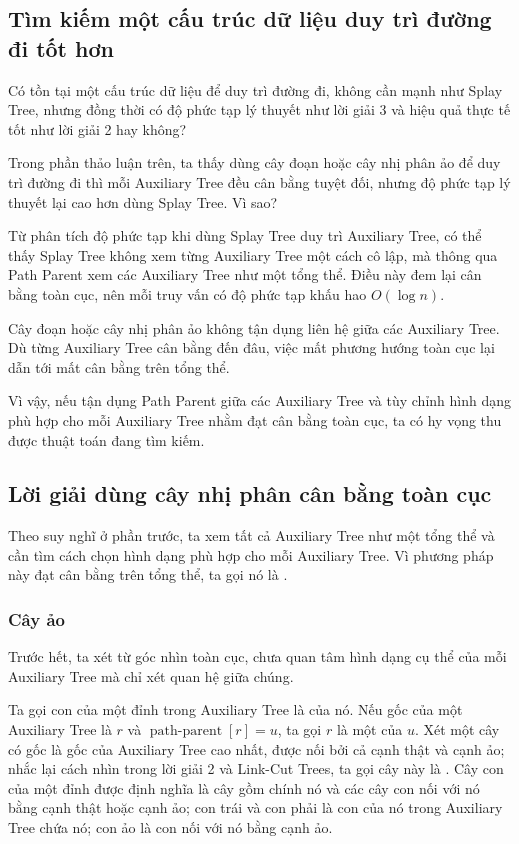 \documentclass[11pt]{article}
\begin{document}
\subsection{Tìm kiếm một cấu trúc dữ liệu duy trì đường đi tốt hơn}

Có tồn tại một cấu trúc dữ liệu để duy trì đường đi, không cần mạnh như
Splay Tree, nhưng đồng thời có độ phức tạp lý thuyết như lời giải 3 và hiệu
quả thực tế tốt như lời giải 2 hay không?

Trong phần thảo luận trên, ta thấy dùng cây đoạn hoặc cây nhị phân ảo để duy
trì đường đi thì mỗi Auxiliary Tree đều cân bằng tuyệt đối, nhưng độ phức tạp
lý thuyết lại cao hơn dùng Splay Tree. Vì sao?

Từ phân tích độ phức tạp khi dùng Splay Tree duy trì Auxiliary Tree, có thể
thấy Splay Tree không xem từng Auxiliary Tree một cách cô lập, mà thông qua
Path Parent xem các Auxiliary Tree như một tổng thể. Điều này đem lại cân bằng
toàn cục, nên mỗi truy vấn có độ phức tạp khấu hao $O(\log n)$.

Cây đoạn hoặc cây nhị phân ảo không tận dụng liên hệ giữa các Auxiliary Tree.
Dù từng Auxiliary Tree cân bằng đến đâu, việc mất phương hướng toàn cục lại
dẫn tới mất cân bằng trên tổng thể.

Vì vậy, nếu tận dụng Path Parent giữa các Auxiliary Tree và tùy chỉnh hình dạng
phù hợp cho mỗi Auxiliary Tree nhằm đạt cân bằng toàn cục, ta có hy vọng thu
được thuật toán đang tìm kiếm.

\subsection{Lời giải dùng cây nhị phân cân bằng toàn cục}

Theo suy nghĩ ở phần trước, ta xem tất cả Auxiliary Tree như một tổng thể và
cần tìm cách chọn hình dạng phù hợp cho mỗi Auxiliary Tree. Vì phương pháp này
đạt cân bằng trên tổng thể, ta gọi nó là .

\subsubsection{Cây ảo}

Trước hết, ta xét từ góc nhìn toàn cục, chưa quan tâm hình dạng cụ thể của mỗi
Auxiliary Tree mà chỉ xét quan hệ giữa chúng.

Ta gọi con của một đỉnh trong Auxiliary Tree là  của nó. Nếu gốc
của một Auxiliary Tree là $r$ và
$\operatorname{path\mbox{-}parent}[r]=u$, ta gọi $r$ là một  của
$u$. Xét một cây có gốc là gốc của Auxiliary Tree cao nhất, được nối bởi cả
cạnh thật và cạnh ảo; nhắc lại cách nhìn trong lời giải 2 và Link-Cut Trees,
ta gọi cây này là . Cây con của một đỉnh được định nghĩa là cây
gồm chính nó và các cây con nối với nó bằng cạnh thật hoặc cạnh ảo; con trái
và con phải là con của nó trong Auxiliary Tree chứa nó; con ảo là con nối với
nó bằng cạnh ảo.
\end{document}
